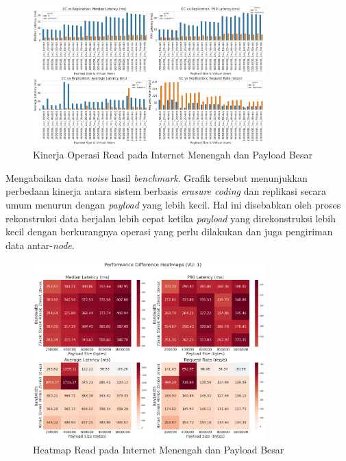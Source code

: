 \begin{enumerate}
	      \begin{figure}[ht]
		      \centering
		      \includegraphics[width=0.8\textwidth]{resources/chapter-4/read_bigload_avgnet.png}

		      \caption{Kinerja Operasi Read pada Internet Menengah dan Payload Besar}
		      \label{fig:read-bigload-avgnet}
	      \end{figure}

	      Mengabaikan data \textit{noise} hasil \textit{benchmark}. Grafik tersebut menunjukkan perbedaan kinerja antara sistem berbasis \textit{erasure coding} dan replikasi secara umum menurun dengan \textit{payload} yang lebih kecil. Hal ini disebabkan oleh proses rekonstruksi data berjalan lebih cepat ketika \textit{payload} yang direkonstruksi lebih kecil dengan berkurangnya operasi yang perlu dilakukan dan juga pengiriman data antar-\textit{node}.

	      \begin{figure}[ht]
		      \centering
		      \includegraphics[width=0.8\textwidth]{resources/chapter-4/read_bigload_avgnet_heatmap.png}

		      \caption{Heatmap Read pada Internet Menengah dan Payload Besar}
		      \label{fig:read-bigload-avgnet-heatmap}
	      \end{figure}


\end{enumerate}
